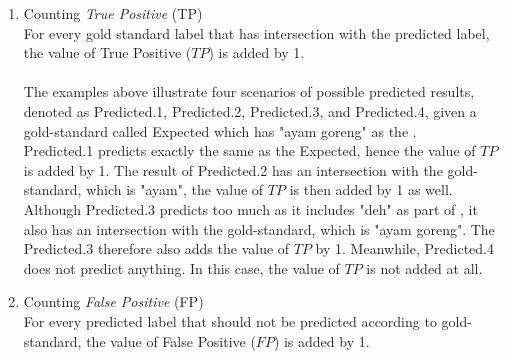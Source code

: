 \begin{enumerate}
	\item Counting \textit{True Positive} (TP)\\
	For every gold standard label that has intersection with the predicted label, the value of True Positive ($TP$) is added by 1.
	\\
	
	\\
	
	The examples above illustrate four scenarios of possible predicted results, denoted as Predicted.1, Predicted.2, Predicted.3, and Predicted.4, given a gold-standard called Expected which has "ayam goreng" as the \patient.
	\\
	
	Predicted.1 predicts exactly the same as the Expected, hence the value of $TP$ is added by 1. The result of Predicted.2 has an intersection with the gold-standard, which is "ayam", the value of $TP$ is then added by 1 as well. Although Predicted.3 predicts too much as it includes "deh" as part of \patient, it also has an intersection with the gold-standard, which is "ayam goreng". The Predicted.3 therefore also adds the value of $TP$ by 1. Meanwhile, Predicted.4 does not predict anything. In this case, the value of $TP$ is not added at all.
	\\
	
	\item Counting \textit{False Positive} (FP)\\
	For every predicted label that should not be predicted according to gold-standard, the value of False Positive ($FP$) is added by 1.
	\\
	
	\\
	

\end{enumerate}

